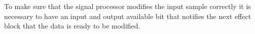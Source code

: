 To make sure that the signal processor modifies the input sample correctly it is necessary to have an input and output available bit that notifies the next effect block that the data is ready to be modified. 






